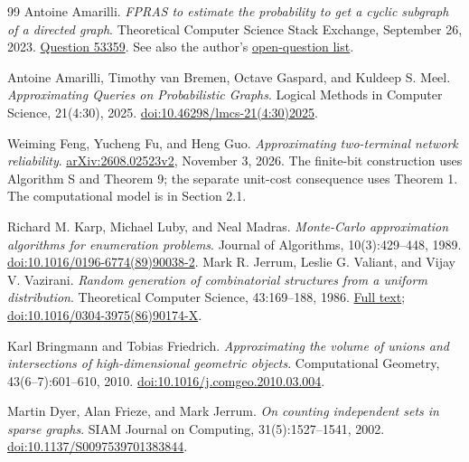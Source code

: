\documentclass[11pt]{article}
\begin{document}
\begin{thebibliography}{99}
Antoine Amarilli.
\emph{FPRAS to estimate the probability to get a cyclic subgraph of a
directed graph}. Theoretical Computer Science Stack Exchange, September 26,
2023. \href{https://cstheory.stackexchange.com/q/53359}{Question 53359}.
See also the author's
\href{https://a3nm.net/work/research/questions/\#fpras-for-the-probability-of-obtaining-a-cyclic-subgraph-of-a-directed-graph}{open-question list}.

Antoine Amarilli, Timothy van Bremen, Octave Gaspard, and Kuldeep S. Meel.
\emph{Approximating Queries on Probabilistic Graphs}.
Logical Methods in Computer Science, 21(4:30), 2025.
\href{https://doi.org/10.46298/lmcs-21(4:30)2025}{doi:10.46298/lmcs-21(4:30)2025}.

Weiming Feng, Yucheng Fu, and Heng Guo.
\emph{Approximating two-terminal network reliability}.
\href{https://arxiv.org/abs/2608.02523v2}{arXiv:2608.02523v2}, November 3, 2026.
The finite-bit construction uses Algorithm S and Theorem 9; the separate
unit-cost consequence uses Theorem 1. The computational model is in Section 2.1.

Richard M. Karp, Michael Luby, and Neal Madras.
\emph{Monte-Carlo approximation algorithms for enumeration problems}.
Journal of Algorithms, 10(3):429--448, 1989.
\href{https://doi.org/10.1016/0196-6774(89)90038-2}{doi:10.1016/0196-6774(89)90038-2}.
Mark R. Jerrum, Leslie G. Valiant, and Vijay V. Vazirani.
\emph{Random generation of combinatorial structures from a uniform distribution}.
Theoretical Computer Science, 43:169--188, 1986.
\href{https://ics.uci.edu/~vazirani/JVV.pdf}{Full text};
\href{https://doi.org/10.1016/0304-3975(86)90174-X}{doi:10.1016/0304-3975(86)90174-X}.

Karl Bringmann and Tobias Friedrich.
\emph{Approximating the volume of unions and intersections of
high-dimensional geometric objects}.
Computational Geometry, 43(6--7):601--610, 2010.
\href{https://doi.org/10.1016/j.comgeo.2010.03.004}{doi:10.1016/j.comgeo.2010.03.004}.

Martin Dyer, Alan Frieze, and Mark Jerrum.
\emph{On counting independent sets in sparse graphs}.
SIAM Journal on Computing, 31(5):1527--1541, 2002.
\href{https://doi.org/10.1137/S0097539701383844}{doi:10.1137/S0097539701383844}.
\end{thebibliography}
\end{document}
